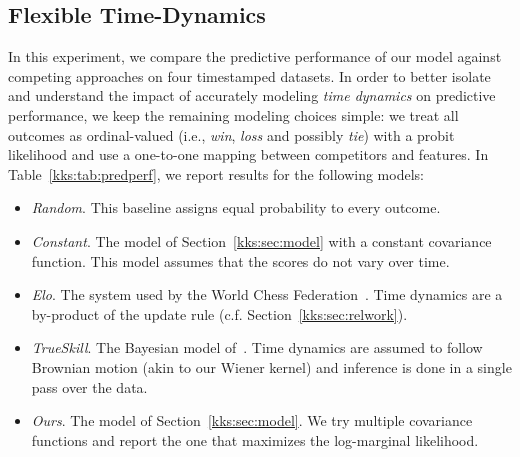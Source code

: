 \subsection{Flexible Time-Dynamics}
\label{kks:sec:evaldyn}

In this experiment, we compare the predictive performance of our model against competing approaches on four timestamped datasets.
In order to better isolate and understand the impact of accurately modeling \emph{time dynamics} on predictive performance, we keep the remaining modeling choices simple: we treat all outcomes as ordinal-valued (i.e., \emph{win}, \emph{loss} and possibly \emph{tie}) with a probit likelihood and use a one-to-one mapping between competitors and features.
In Table~\ref{kks:tab:predperf}, we report results for the following models:
\begin{itemize}
	\item \emph{Random}. This baseline assigns equal probability to every outcome.

	\item \emph{Constant}. The model of Section~\ref{kks:sec:model} with a constant covariance function.
	      This model assumes that the scores do not vary over time.

	\item \emph{Elo}. The system used by the World Chess Federation~\citep{elo1978rating}.
	      Time dynamics are a by-product of the update rule (c.f. Section~\ref{kks:sec:relwork}).

	\item \emph{TrueSkill}. The Bayesian model of~\citet{herbrich2006trueskill}.
	      Time dynamics are assumed to follow Brownian motion (akin to our Wiener kernel) and inference is done in a single pass over the data.

	\item \emph{Ours}. The model of Section~\ref{kks:sec:model}.
	      We try multiple covariance functions and report the one that maximizes the log-marginal likelihood.
\end{itemize}

